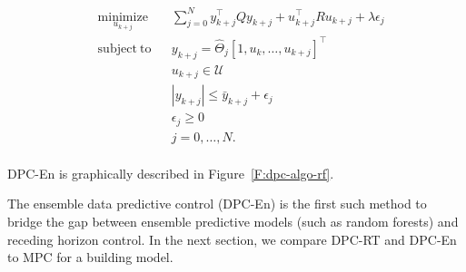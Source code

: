 \begin{problem}\label{P:dpcrf}
	\begin{equation}
	\begin{aligned}
	& \underset{u_{k+j}}{\mathrm{minimize}} & & \sum_{j=0}^{N} y^\top_{k+j} Q y_{k+j} + u^\top_{k+j} R u_{k+j} + \lambda\epsilon_j \\
	& \mathrm{subject\ to }                 & & y_{k+j}      =  \hat{\Theta}_j [1,u_{k},\ldots,u_{k+j} ]^\top                      \\
	&                                       & & u_{k+j}    \in  \mathcal{U}                                                        \\
	&                                       & & |y_{k+j}|  \leq \bar{y}_{k+j} + \epsilon_j 										 \\
	&                                       & & \epsilon_j \geq  0							                                     \\
	&                                       & & j           =    0,\ldots,N.            									         \\
	\end{aligned}
	\label{E:dpcrf}
	\end{equation}
\end{problem}
DPC-En is graphically described in Figure~\ref{F:dpc-algo-rf}.

The ensemble data predictive control (DPC-En) is the first such method to bridge the gap between ensemble predictive models (such as random forests) and receding horizon control. In the next section, we compare DPC-RT and DPC-En to MPC for a building model.

